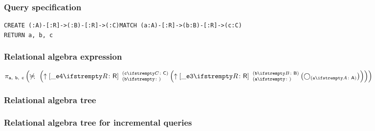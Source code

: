 \subsubsection*{Query specification}

\begin{lstlisting}
CREATE (:A)-[:R]->(:B)-[:R]->(:C)MATCH (a:A)-[:R]->(b:B)-[:R]->(c:C)
RETURN a, b, c
\end{lstlisting}

\subsubsection*{Relational algebra expression}

$\projection{\var{a},~\var{b},~\var{c}} \left(\alldifferent{} \left(\expandout{\_e4}{R}{b}{c}{C} \left(\expandout{\_e3}{R}{a}{b}{B} \left(\getvertices{a}{A}\right)\right)\right)\right)$

\subsubsection*{Relational algebra tree}


\subsubsection*{Relational algebra tree for incremental queries}


